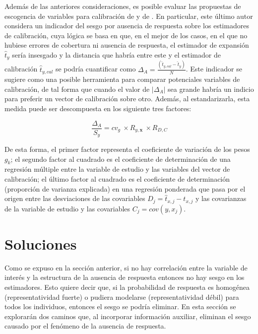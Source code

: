 \documentclass[
  12pt,
  spanish,
]{book}
\begin{document}
Además de las anteriores consideraciones, es posible evaluar las propuestas de escogencia de variables para calibración de \citet{KaltonFloresCervantes_2003} y de \citet{Sarndal_2011}. En particular, este último autor considera un indicador del sesgo por ausencia de respuesta sobre los estimadores de calibración, cuya lógica se basa en que, en el mejor de los casos, en el que no hubiese errores de cobertura ni ausencia de respuesta, el estimador de expansión \(\hat{t}_{y}\) sería insesgado y la distancia que habría entre este y el estimador de calibración \(\hat{t}_{y,cal}\) se podría cuantificar como \(\Delta_A = \frac{(\hat{t}_{y,cal} - \hat{t}_{y})}{N}\). Este indicador se sugiere como una posible herramienta para comparar potenciales variables de calibración, de tal forma que cuando el valor de \(|\Delta_A|\) sea grande habría un indicio para preferir un vector de calibración sobre otro. Además, al estandarizarla, esta medida puede ser descompuesta en los siguiente tres factores:

\[\frac{\Delta_A}{S_y} = cv_g \ \times R_{y,\mathbf{x}} \ \times R_{D,C}\]

De esta forma, el primer factor representa el coeficiente de variación de los pesos \(g_k\); el segundo factor al cuadrado es el coeficiente de determinación de una regresión múltiple entre la variable de estudio y las variables del vector de calibración; el último factor al cuadrado es el coeficiente de determinación (proporción de varianza explicada) en una regresión ponderada que pasa por el origen entre las desviaciones de las covariables \(D_j = \hat{t}_{x, j} - t_{x,j}\) y las covarianzas de la variable de estudio y las covariables \(C_j = cov(y, x_j)\).

\hypertarget{soluciones}{%
\section{Soluciones}\label{soluciones}}

Como se expuso en la sección anterior, si no hay correlación entre la variable de interés y la estructura de la ausencia de respuesta entonces no hay sesgo en los estimadores. Esto quiere decir que, si la probabilidad de respuesta es homogénea (representatividad fuerte) o pudiera modelarse (representatividad débil) para todos los individuos, entonces el sesgo se podría eliminar. En esta sección se explorarán dos caminos que, al incorporar información auxiliar, eliminan el sesgo causado por el fenómeno de la ausencia de respuesta.
\end{document}
